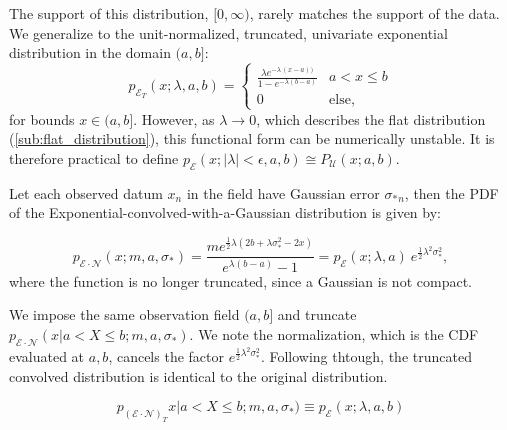 \documentclass[twocolumn]{aastex631}
\newcommand{\mcal}[1]{\mathcal{#1}}
\newcommand{\Exp}[1]{e^{#1}}
\newcommand{\pdf}{p}
\newcommand{\sigobs}{{\sigma_*}}
\begin{document}
        The support of this distribution, $[0, \infty)$, rarely matches the
        support of the data. We generalize to the unit-normalized, truncated,
        univariate exponential distribution in the domain $(a, b]$:
        \begin{equation} \label{eq:pdf_truncexp_univariate}
            \pdf_{\mcal{E}_T}(x; \lambda, a, b) = \begin{cases}
                \frac{\lambda \Exp{-\lambda \, (x - a))}}{1 - \Exp{-\lambda(b - a)}} & a < x \leq b \\
                0 & \text{else},
            \end{cases}
        \end{equation}
        for bounds $x \in (a,b]$. However, as $\lambda \rightarrow 0$, which
        describes the flat distribution (\autoref{sub:flat_distribution}), this
        functional form can be numerically unstable. It is therefore practical
        to define $\pdf_{\mcal{E}}(x; |\lambda| < \epsilon, a, b) \cong
        P_{\mcal{U}}(x; a,b)$.

        Let each observed datum $x_n$ in the field have Gaussian error
        $\sigobs_n$, then the PDF of the Exponential-convolved-with-a-Gaussian
        distribution is given by:

        \begin{equation}
            \pdf_{\mcal{E}\cdot\mcal{N}}(x;m,a,\sigma_*) = \frac{m  e^{\frac{1}{2} \lambda  \left(2 b+\lambda  \sigma _*^2-2 x\right)}}{e^{\lambda  (b-a)}-1} = \pdf_{\mcal{E}}(x;\lambda,a) \ \Exp{\frac{1}{2}\lambda^2 \sigma_*^2},
        \end{equation}
        where the function is no longer truncated, since a Gaussian is not
        compact.

        We impose the same observation field $(a, b]$ and truncate
        $\pdf_{\mcal{E}\cdot\mcal{N}}(x | a < X \leq b;m,a,\sigma_*)$.  We note
        the normalization, which is the CDF evaluated at $a, b$, cancels the
        factor $\Exp{\frac{1}{2}\lambda^2 \sigma_*^2}$. Following thtough, the
        truncated convolved distribution is identical to the original
        distribution.

        \begin{equation}
            \pdf_{(\mcal{E}\cdot\mcal{N})_T}x | a < X \leq b;m,a,\sigma_*) \equiv \pdf_{\mcal{E}}(x; \lambda, a, b)
        \end{equation}

    \vspace{10pt}
\end{document}

